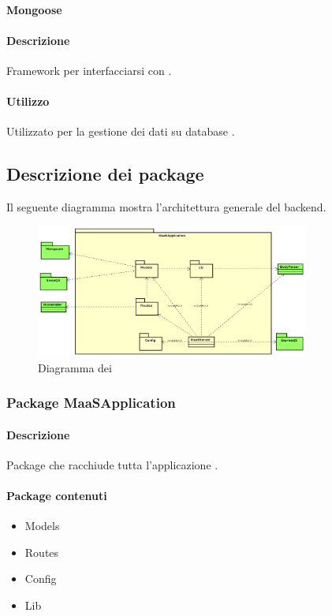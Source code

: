 \paragraph{Mongoose}
\paragraph*{Descrizione}
Framework per interfacciarsi con .

\paragraph*{Utilizzo}
Utilizzato per la gestione dei dati su database .

\subsection{Descrizione dei package}
Il seguente diagramma mostra l'architettura generale del backend.
\begin{figure}[H]
\centering
\includegraphics[width=0.8\textwidth]{res/sections/backend/generale.png}
\caption{Diagramma dei }
\end{figure}

\subsubsection{Package MaaSApplication}
\paragraph*{Descrizione}
Package che racchiude tutta l'applicazione .

\paragraph*{Package contenuti}
\begin{itemize}
\item Models
\item Routes
\item Config
\item Lib
\end{itemize}

